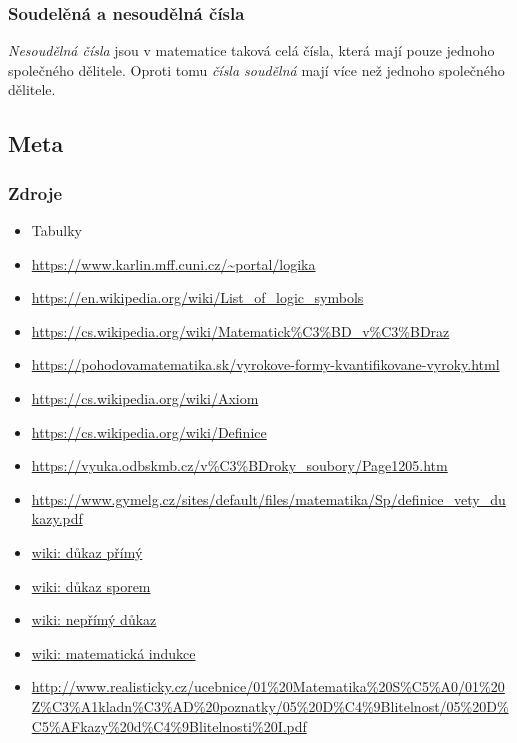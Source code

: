 \documentclass[12pt]{article}
\begin{document}
\subsubsection{Soudelěná a nesoudělná čísla}
\emph{Nesoudělná čísla} jsou v matematice taková celá čísla, která mají pouze jednoho společného dělitele. Oproti tomu \emph{čísla soudělná} mají více než jednoho společného dělitele.
\subsection{Meta}
\subsubsection{Zdroje}
\begin{itemize}
\item Tabulky
\item \url{https://www.karlin.mff.cuni.cz/~portal/logika}
\item \url{https://en.wikipedia.org/wiki/List_of_logic_symbols}
\item \url{https://cs.wikipedia.org/wiki/Matematick\%C3\%BD_v\%C3\%BDraz}
\item \url{https://pohodovamatematika.sk/vyrokove-formy-kvantifikovane-vyroky.html}
\item \url{https://cs.wikipedia.org/wiki/Axiom}
\item \url{https://cs.wikipedia.org/wiki/Definice}
\item \url{https://vyuka.odbskmb.cz/v\%C3\%BDroky_soubory/Page1205.htm}
\item \url{https://www.gymelg.cz/sites/default/files/matematika/Sp/definice_vety_dukazy.pdf}
\item \href{https://cs.wikipedia.org/wiki/P\%C5\%99\%C3\%ADm\%C3\%BD_d\%C5\%AFkaz}{wiki: důkaz přímý}
\item \href{https://cs.wikipedia.org/wiki/D\%C5\%AFkaz_sporem}{wiki: důkaz sporem}
\item \href{https://cs.wikipedia.org/wiki/Nep\%C5\%99\%C3\%ADm\%C3\%BD_d\%C5\%AFkaz}{wiki: nepřímý důkaz}
\item \href{https://cs.wikipedia.org/wiki/Matematick\%C3\%A1_indukce}{wiki: matematická indukce}
\item \url{http://www.realisticky.cz/ucebnice/01\%20Matematika\%20S\%C5\%A0/01\%20Z\%C3\%A1kladn\%C3\%AD\%20poznatky/05\%20D\%C4\%9Blitelnost/05\%20D\%C5\%AFkazy\%20d\%C4\%9Blitelnosti\%20I.pdf}

\end{itemize}
\end{document}
